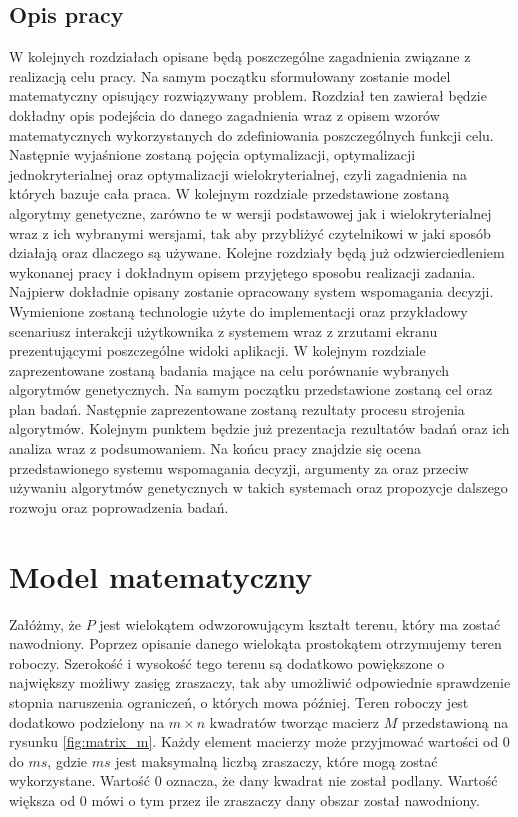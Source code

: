 \documentclass[twoside]{iisthesis}
\begin{document}
\section{Opis pracy}
W kolejnych rozdziałach opisane będą poszczególne zagadnienia związane z realizacją celu pracy. Na samym początku sformułowany zostanie model matematyczny opisujący rozwiązywany problem. Rozdział ten zawierał będzie dokładny opis podejścia do danego zagadnienia wraz z opisem wzorów matematycznych wykorzystanych do zdefiniowania poszczególnych funkcji celu. Następnie wyjaśnione zostaną pojęcia optymalizacji, optymalizacji jednokryterialnej oraz optymalizacji wielokryterialnej, czyli zagadnienia na których bazuje cała praca. W kolejnym rozdziale przedstawione zostaną algorytmy genetyczne, zarówno te w wersji podstawowej jak i wielokryterialnej wraz z ich wybranymi wersjami, tak aby przybliżyć czytelnikowi w jaki sposób działają oraz dlaczego są używane. Kolejne rozdziały będą już odzwierciedleniem wykonanej pracy i dokładnym opisem przyjętego sposobu realizacji zadania. Najpierw dokładnie opisany zostanie opracowany system wspomagania decyzji. Wymienione zostaną technologie użyte do implementacji oraz przykładowy scenariusz interakcji użytkownika z systemem wraz z zrzutami ekranu prezentującymi poszczególne widoki aplikacji. W kolejnym rozdziale zaprezentowane zostaną badania mające na celu porównanie wybranych algorytmów genetycznych. Na samym początku przedstawione zostaną cel oraz plan badań. Następnie zaprezentowane zostaną rezultaty procesu strojenia algorytmów. Kolejnym punktem będzie już prezentacja rezultatów badań oraz ich analiza wraz z podsumowaniem. Na końcu pracy znajdzie się ocena przedstawionego systemu wspomagania decyzji, argumenty za oraz przeciw używaniu algorytmów genetycznych w takich systemach oraz propozycje dalszego rozwoju oraz poprowadzenia badań.

\chapter{Model matematyczny}
Załóżmy, że $P$ jest wielokątem odwzorowującym kształt terenu, który ma zostać nawodniony. Poprzez opisanie danego wielokąta prostokątem otrzymujemy teren roboczy. Szerokość i wysokość tego terenu są dodatkowo powiększone o największy możliwy zasięg zraszaczy, tak aby umożliwić odpowiednie sprawdzenie stopnia naruszenia ograniczeń, o których mowa później. Teren roboczy jest dodatkowo podzielony na $m \times n$ kwadratów tworząc macierz $M$ przedstawioną na rysunku \eqref{fig:matrix_m}. Każdy element macierzy może przyjmować wartości od 0 do $ms$, gdzie $ms$ jest maksymalną liczbą zraszaczy, które mogą zostać wykorzystane. Wartość 0 oznacza, że dany kwadrat nie został podlany. Wartość większa od 0 mówi o tym przez ile zraszaczy dany obszar został nawodniony.
\end{document}
